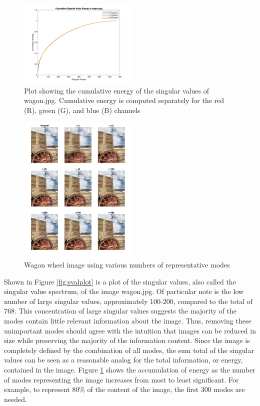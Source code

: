 \documentclass[conference]{IEEEtran}
\begin{document}
	\begin{figure}[t]
        \includegraphics[width=0.5\textwidth]{sv_energy_wagon_rgb}
        \caption{Plot showing the cumulative energy of the singular values of wagon.jpg. Cumulative energy is computed separately for the red (R), green (G), and blue (B) channels}
        \label{fig:svalenergyplot}
    \end{figure}
    
    \begin{figure}[t]
        \includegraphics[width=0.5\textwidth]{show_different_r_wagon}
        \caption{Wagon wheel image using various numbers of representative modes}
        \label{fig:showwagondiffr}
    \end{figure}
    
    Shown in Figure \ref{fig:svalplot} is a plot of the singular values, also called the singular value spectrum, of the image wagon.jpg. Of particular note is the low number of large singular values, approximately 100-200, compared to the total of 768. This concentration of large singular values suggests the majority of the modes contain little relevant information about the image. Thus, removing these unimportant modes should agree with the intuition that images can be reduced in size while preserving the majority of the information content. Since the image is completely defined by the combination of all modes, the sum total of the singular values can be seen as a reasonable analog for the total information, or energy, contained in the image. Figure \ref{fig:svalenergyplot} shows the accumulation of energy as the number of modes representing the image increases from most to least significant. For example, to represent 80\% of the content of the image, the first 300 modes are needed.
\end{document}
